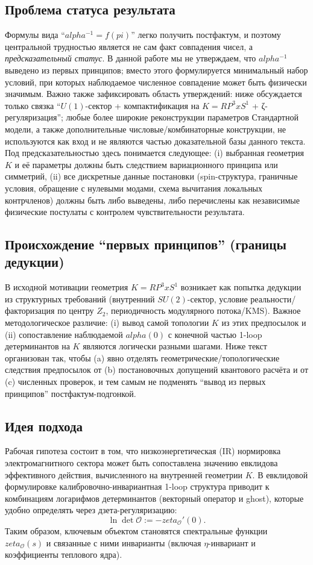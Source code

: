 \documentclass[12pt]{article}
\def\mathbb#1{#1}%
\def\alpha{alpha}%
\def\pi{pi}%
\def\times{x}%
\def\zeta{zeta}%
\begin{document}
\subsection{Проблема статуса результата}
Формулы вида ``$\alpha^{-1}=f(\pi)$'' легко получить постфактум, и поэтому центральной трудностью является не сам факт совпадения чисел, а \emph{предсказательный статус}.
В данной работе мы не утверждаем, что $\alpha^{-1}$ выведено из первых принципов; вместо этого формулируется минимальный набор условий, при которых наблюдаемое численное совпадение может быть физически значимым.
Важно также зафиксировать область утверждений: ниже обсуждается только связка ``$U(1)$-сектор + компактификация на $K=\mathbb{RP}^3\times S^1$ + ζ-регуляризация''; любые более широкие реконструкции параметров Стандартной модели, а также дополнительные числовые/комбинаторные конструкции, не используются как вход и не являются частью доказательной базы данного текста.
Под предсказательностью здесь понимается следующее: (i) выбранная геометрия $K$ и её параметры должны быть следствием вариационного принципа или симметрий, (ii) все дискретные данные постановки (spin-структура, граничные условия, обращение с нулевыми модами, схема вычитания локальных контрчленов) должны быть либо выведены, либо перечислены как независимые физические постулаты с контролем чувствительности результата.

\subsection{Происхождение ``первых принципов'' (границы дедукции)}
В исходной мотивации геометрия $K=\mathbb{RP}^3\times S^1$ возникает как попытка дедукции из структурных требований (внутренний $SU(2)$-сектор, условие реальности/факторизация по центру $\mathbb{Z}_2$, периодичность модулярного потока/KMS).
Важное методологическое различие: (i) вывод самой топологии $K$ из этих предпосылок и (ii) сопоставление наблюдаемой $\alpha(0)$ с конечной частью 1-loop детерминантов на $K$ являются логически разными шагами.
Ниже текст организован так, чтобы (a) явно отделять геометрические/топологические следствия предпосылок от (b) постановочных допущений квантового расчёта и от (c) численных проверок, и тем самым не подменять ``вывод из первых принципов'' постфактум-подгонкой.

\subsection{Идея подхода}
Рабочая гипотеза состоит в том, что низкоэнергетическая (IR) нормировка электромагнитного сектора может быть сопоставлена значению евклидова эффективного действия, вычисленного на внутренней геометрии $K$.
В евклидовой формулировке калибровочно-инвариантная 1-loop структура приводит к комбинациям логарифмов детерминантов (векторный оператор и ghost), которые удобно определять через дзета-регуляризацию:
\begin{equation}
\ln\det \mathcal{O}:= -\zeta_{\mathcal{O}}'(0).
\end{equation}
Таким образом, ключевым объектом становятся спектральные функции $\zeta_{\mathcal{O}}(s)$ и связанные с ними инварианты (включая $\eta$-инвариант и коэффициенты теплового ядра).
\end{document}
